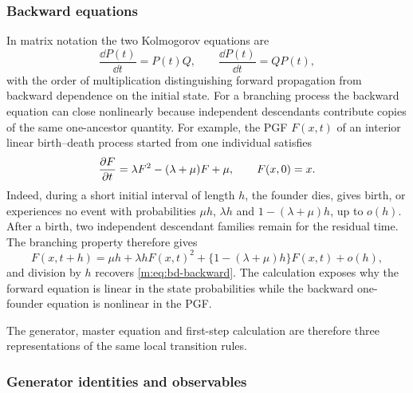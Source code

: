 \subsubsection{Backward equations}\label{m:sec:backward-equations}

In matrix notation the two Kolmogorov equations are
\begin{equation}
  \frac{\dd P(t)}{\dd t}=P(t)Q,
  \qquad
  \frac{\dd P(t)}{\dd t}=QP(t),
  \label{m:eq:kolmogorov-pair}
\end{equation}
with the order of multiplication distinguishing forward propagation from backward
dependence on the initial state.  For a branching process the backward equation
can close nonlinearly because independent descendants contribute copies of the same
one-ancestor quantity.  For example, the PGF $F(x,t)$ of an interior linear
birth--death process started from one individual satisfies
\begin{equation}
  \frac{\partial F}{\partial t}=\lambda F^2-(\lambda+\mu)F+\mu,
  \qquad F(x,0)=x.
  \label{m:eq:bd-backward}
\end{equation}
Indeed, during a short initial interval of length $h$, the founder dies, gives
birth, or experiences no event with probabilities $\mu h$, $\lambda h$ and
$1-(\lambda+\mu)h$, up to $o(h)$.  After a birth, two independent descendant
families remain for the residual time.  The branching property therefore gives
\begin{equation}
  F(x,t+h)=\mu h+\lambda hF(x,t)^2
  +\{1-(\lambda+\mu)h\}F(x,t)+o(h),
  \label{m:eq:bd-backward-step}
\end{equation}
and division by $h$ recovers \cref{m:eq:bd-backward}.  The calculation exposes
why the forward equation is linear in the state probabilities while the backward
one-founder equation is nonlinear in the PGF.

The generator, master equation and first-step calculation are therefore three
representations of the same local transition rules.

\subsubsection{Generator identities and observables}
\label{m:sec:generator-observables}


